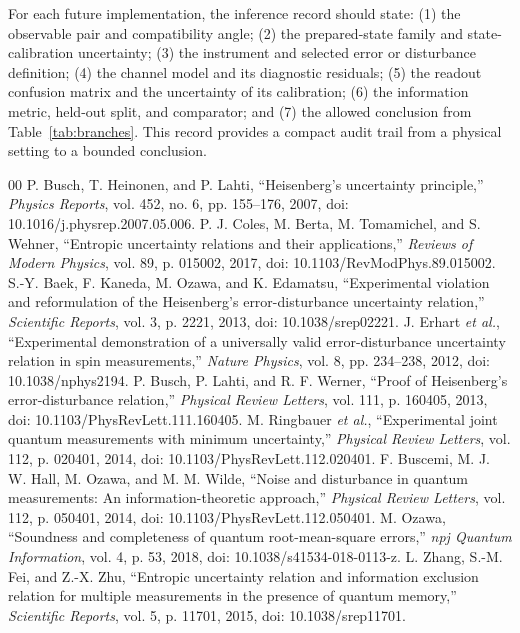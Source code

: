 \documentclass[conference]{../../../../Conference-LaTeX-template_10-17-19/IEEEtran}
\begin{document}
For each future implementation, the inference record should state: (1) the observable pair and compatibility angle; (2) the prepared-state family and state-calibration uncertainty; (3) the instrument and selected error or disturbance definition; (4) the channel model and its diagnostic residuals; (5) the readout confusion matrix and the uncertainty of its calibration; (6) the information metric, held-out split, and comparator; and (7) the allowed conclusion from Table~\ref{tab:branches}. This record provides a compact audit trail from a physical setting to a bounded conclusion.

\begin{thebibliography}{00}
 P. Busch, T. Heinonen, and P. Lahti, ``Heisenberg's uncertainty principle,'' \emph{Physics Reports}, vol. 452, no. 6, pp. 155--176, 2007, doi: 10.1016/j.physrep.2007.05.006.
 P. J. Coles, M. Berta, M. Tomamichel, and S. Wehner, ``Entropic uncertainty relations and their applications,'' \emph{Reviews of Modern Physics}, vol. 89, p. 015002, 2017, doi: 10.1103/RevModPhys.89.015002.
 S.-Y. Baek, F. Kaneda, M. Ozawa, and K. Edamatsu, ``Experimental violation and reformulation of the Heisenberg's error-disturbance uncertainty relation,'' \emph{Scientific Reports}, vol. 3, p. 2221, 2013, doi: 10.1038/srep02221.
 J. Erhart \emph{et al.}, ``Experimental demonstration of a universally valid error-disturbance uncertainty relation in spin measurements,'' \emph{Nature Physics}, vol. 8, pp. 234--238, 2012, doi: 10.1038/nphys2194.
 P. Busch, P. Lahti, and R. F. Werner, ``Proof of Heisenberg's error-disturbance relation,'' \emph{Physical Review Letters}, vol. 111, p. 160405, 2013, doi: 10.1103/PhysRevLett.111.160405.
 M. Ringbauer \emph{et al.}, ``Experimental joint quantum measurements with minimum uncertainty,'' \emph{Physical Review Letters}, vol. 112, p. 020401, 2014, doi: 10.1103/PhysRevLett.112.020401.
 F. Buscemi, M. J. W. Hall, M. Ozawa, and M. M. Wilde, ``Noise and disturbance in quantum measurements: An information-theoretic approach,'' \emph{Physical Review Letters}, vol. 112, p. 050401, 2014, doi: 10.1103/PhysRevLett.112.050401.
 M. Ozawa, ``Soundness and completeness of quantum root-mean-square errors,'' \emph{npj Quantum Information}, vol. 4, p. 53, 2018, doi: 10.1038/s41534-018-0113-z.
 L. Zhang, S.-M. Fei, and Z.-X. Zhu, ``Entropic uncertainty relation and information exclusion relation for multiple measurements in the presence of quantum memory,'' \emph{Scientific Reports}, vol. 5, p. 11701, 2015, doi: 10.1038/srep11701.

\end{thebibliography}
\end{document}
